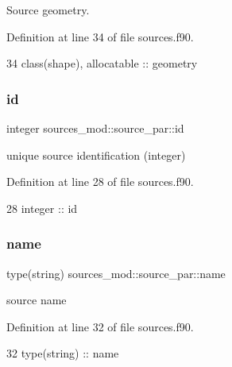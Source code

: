 Source geometry. 



Definition at line 34 of file sources.\+f90.


\begin{DoxyCode}
34         \textcolor{keywordtype}{class}(shape), \textcolor{keywordtype}{allocatable} :: geometry
\end{DoxyCode}
\mbox{\label{structsources__mod_1_1source__par_a88d333946d18fee527b7b207f44dd3ff}} 
\subsubsection{\texorpdfstring{id}{id}}
{\footnotesize\ttfamily integer sources\+\_\+mod\+::source\+\_\+par\+::id\hspace{0.3cm}{\ttfamily [private]}}



unique source identification (integer) 



Definition at line 28 of file sources.\+f90.


\begin{DoxyCode}
28         \textcolor{keywordtype}{integer} :: id
\end{DoxyCode}
\mbox{\label{structsources__mod_1_1source__par_ac56d7761e7da3a906a3f0fbf4c7f49f8}} 
\subsubsection{\texorpdfstring{name}{name}}
{\footnotesize\ttfamily type(string) sources\+\_\+mod\+::source\+\_\+par\+::name\hspace{0.3cm}{\ttfamily [private]}}



source name 



Definition at line 32 of file sources.\+f90.


\begin{DoxyCode}
32         \textcolor{keywordtype}{type}(string) :: name
\end{DoxyCode}
\mbox{\label{structsources__mod_1_1source__par_a66e7627f128290f25c2c9eb36808eb5b}} 
